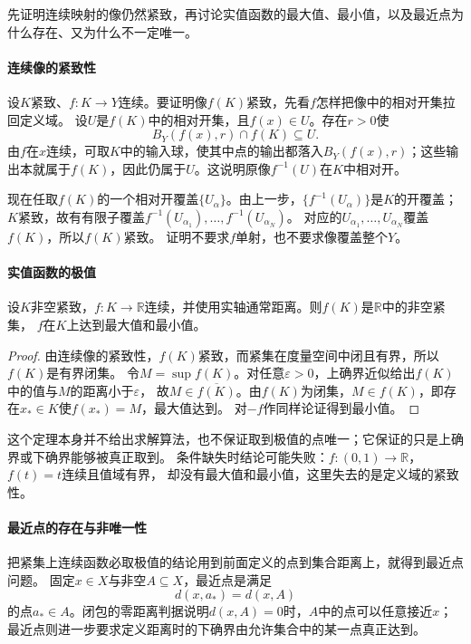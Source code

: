 先证明连续映射的像仍然紧致，再讨论实值函数的最大值、最小值，以及最近点为什么存在、又为什么不一定唯一。

\paragraph{连续像的紧致性}

设$K$紧致、$f:K\to Y$连续。要证明像$f(K)$紧致，先看$f$怎样把像中的相对开集拉回定义域。
设$U$是$f(K)$中的相对开集，且$f(x)\in U$。存在$r>0$使
\[
  B_Y(f(x),r)\cap f(K)\subseteq U.
\]
由$f$在$x$连续，可取$K$中的输入球，使其中点的输出都落入$B_Y(f(x),r)$；这些输出本就属于$f(K)$，因此仍属于$U$。这说明原像$f^{-1}(U)$在$K$中相对开。

现在任取$f(K)$的一个相对开覆盖$\{U_\alpha\}$。由上一步，$\{f^{-1}(U_\alpha)\}$是$K$的开覆盖；
$K$紧致，故有有限子覆盖$f^{-1}(U_{\alpha_1}),\ldots,f^{-1}(U_{\alpha_N})$。
对应的$U_{\alpha_1},\ldots,U_{\alpha_N}$覆盖$f(K)$，所以$f(K)$紧致。
证明不要求$f$单射，也不要求像覆盖整个$Y$。

\paragraph{实值函数的极值}

\begin{theorem}[紧集上实值连续函数的极值]
\label{thm:metric-extreme-value}
设$K$非空紧致，$f:K\to\mathbb R$连续，并使用实轴通常距离。则$f(K)$是$\mathbb R$中的非空紧集，
$f$在$K$上达到最大值和最小值。
\end{theorem}

\begin{proof}
由连续像的紧致性，$f(K)$紧致，而紧集在度量空间中闭且有界，所以$f(K)$是有界闭集。
令$M=\sup f(K)$。对任意$\varepsilon>0$，上确界近似给出$f(K)$中的值与$M$的距离小于$\varepsilon$，
故$M\in\overline{f(K)}$。由$f(K)$为闭集，$M\in f(K)$，即存在$x_*\in K$使$f(x_*)=M$，最大值达到。
对$-f$作同样论证得到最小值。
\end{proof}

这个定理本身并不给出求解算法，也不保证取到极值的点唯一；它保证的只是上确界或下确界能够被真正取到。
条件缺失时结论可能失败：$f:(0,1)\to\mathbb R$，$f(t)=t$连续且值域有界，
却没有最大值和最小值，这里失去的是定义域的紧致性。

\paragraph{最近点的存在与非唯一性}

把紧集上连续函数必取极值的结论用到前面定义的点到集合距离上，就得到最近点问题。
固定$x\in X$与非空$A\subseteq X$，最近点是满足
\[
  d(x,a_*)=d(x,A)
\]
的点$a_*\in A$。闭包的零距离判据说明$d(x,A)=0$时，$A$中的点可以任意接近$x$；
最近点则进一步要求定义距离时的下确界由允许集合中的某一点真正达到。

